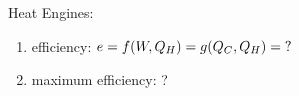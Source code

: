 

\vspace*{\fill}
\centering

Heat Engines:
\begin{enumerate}
    \item efficiency: $e = f(W,Q_{H}) = g(Q_{C},Q_{H}) = {\rm ?}$ 
    \item maximum efficiency: ?
\end{enumerate}

\centering
\vspace*{\fill}

